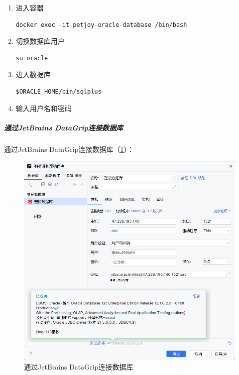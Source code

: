 \begin{enumerate}
    \item 进入容器
          \begin{verbatim}
docker exec -it petjoy-oracle-database /bin/bash
          \end{verbatim}
    \item 切换数据库用户
          \begin{verbatim}
su oracle
          \end{verbatim}
    \item 进入数据库
          \begin{verbatim}
$ORACLE_HOME/bin/sqlplus
          \end{verbatim}
    \item 输入用户名和密码
\end{enumerate}

\subparagraph{通过JetBrains DataGrip连接数据库}

通过JetBrains DataGrip连接数据库（\cref{fig:ConnectViaDataGrip}）：

\begin{figure}[htbp]
    \centering
    \includegraphics[width=\textwidth]{figures/ConnectViaDataGrip.png}
    \caption{通过JetBrains DataGrip连接数据库}
    \label{fig:ConnectViaDataGrip}
\end{figure}

